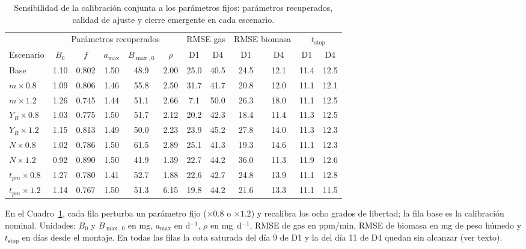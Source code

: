 \documentclass[11pt,a4paper]{article}
\begin{document}
\begin{table}[htbp]
\centering
\footnotesize
\caption{Sensibilidad de la calibración conjunta a los parámetros fijos: parámetros recuperados, calidad de ajuste y cierre emergente en cada escenario.}
\label{tab:sensibilidad}
\begin{tabular}{l ccccc cc cc cc}
\toprule
& \multicolumn{5}{c}{Parámetros recuperados} & \multicolumn{2}{c}{RMSE gas} & \multicolumn{2}{c}{RMSE biomasa} & \multicolumn{2}{c}{$t_{\mathrm{stop}}$} \\
\cmidrule(lr){2-6} \cmidrule(lr){7-8} \cmidrule(lr){9-10} \cmidrule(lr){11-12}
Escenario & $B_0$ & $f$ & $a_{\max}$ & $B_{\max,0}$ & $\rho$ & D1 & D4 & D1 & D4 & D1 & D4 \\
\midrule
Base & 1.10 & 0.802 & 1.50 & 48.9 & 2.00 & 25.0 & 40.5 & 24.5 & 12.1 & 11.4 & 12.5 \\
$m \times 0.8$ & 1.09 & 0.806 & 1.46 & 55.8 & 2.50 & 31.7 & 41.7 & 20.8 & 12.0 & 11.1 & 12.1 \\
$m \times 1.2$ & 1.26 & 0.745 & 1.44 & 51.1 & 2.66 & 7.1 & 50.0 & 26.3 & 18.0 & 11.1 & 12.5 \\
$Y_B \times 0.8$ & 1.03 & 0.775 & 1.50 & 51.7 & 2.12 & 20.2 & 42.3 & 18.4 & 11.4 & 11.3 & 12.5 \\
$Y_B \times 1.2$ & 1.15 & 0.813 & 1.49 & 50.0 & 2.23 & 23.9 & 45.2 & 27.8 & 14.0 & 11.3 & 12.3 \\
$N \times 0.8$ & 1.02 & 0.786 & 1.50 & 61.5 & 2.89 & 25.1 & 41.3 & 19.3 & 14.6 & 11.1 & 12.3 \\
$N \times 1.2$ & 0.92 & 0.890 & 1.50 & 41.9 & 1.39 & 22.7 & 44.2 & 36.0 & 11.3 & 11.9 & 12.6 \\
$t_{pm} \times 0.8$ & 1.27 & 0.780 & 1.41 & 52.7 & 1.88 & 22.6 & 42.7 & 24.8 & 13.9 & 11.1 & 12.8 \\
$t_{pm} \times 1.2$ & 1.14 & 0.767 & 1.50 & 51.3 & 6.15 & 19.8 & 44.2 & 21.6 & 13.3 & 11.1 & 11.5 \\
\bottomrule
\end{tabular}
\end{table}

\noindent En el Cuadro~\ref{tab:sensibilidad}, cada fila perturba un parámetro fijo ($\times 0.8$ o $\times 1.2$) y recalibra los ocho grados de libertad; la fila base es la calibración nominal. Unidades: $B_0$ y $B_{\max,0}$ en mg, $a_{\max}$ en d$^{-1}$, $\rho$ en mg~d$^{-1}$, RMSE de gas en ppm/min, RMSE de biomasa en mg de peso húmedo y $t_{\mathrm{stop}}$ en días desde el montaje. En todas las filas la cota saturada del día 9 de D1 y la del día 11 de D4 quedan sin alcanzar (ver texto).
\end{document}
